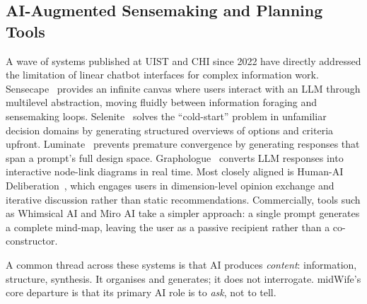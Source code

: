 \documentclass[sigconf]{acmart}
\begin{document}
\subsection{AI-Augmented Sensemaking and Planning Tools}
A wave of systems published at UIST and CHI since 2022 have directly addressed the
limitation of linear chatbot interfaces for complex information work. Sensecape~\cite{suh2023sensecape}
provides an infinite canvas where users interact with an LLM through multilevel
abstraction, moving fluidly between information foraging and sensemaking loops.
Selenite~\cite{liu2024selenite} solves the ``cold-start'' problem in unfamiliar
decision domains by generating structured overviews of options and criteria upfront.
Luminate~\cite{suh2024luminate} prevents premature convergence by generating responses
that span a prompt's full design space. Graphologue~\cite{jiang2023graphologue} converts
LLM responses into interactive node-link diagrams in real time. Most closely aligned
is Human-AI Deliberation~\cite{ma2025deliberation}, which engages users in
dimension-level opinion exchange and iterative discussion rather than static
recommendations. Commercially, tools such as Whimsical AI and Miro AI take a simpler
approach: a single prompt generates a complete mind-map, leaving the user as a passive
recipient rather than a co-constructor.

A common thread across these systems is that AI produces \textit{content}: information,
structure, synthesis. It organises and generates; it does not interrogate. midWife's
core departure is that its primary AI role is to \textit{ask}, not to tell.
\end{document}
